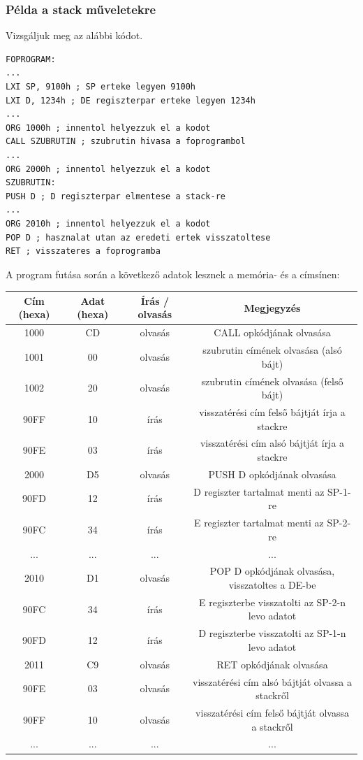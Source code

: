 \documentclass{article}
\begin{document}
\subsubsection{Példa a stack műveletekre}
Vizsgáljuk meg az alábbi kódot.
\begin{lstlisting}[frame=single]
FOPROGRAM:
...
LXI SP, 9100h ; SP erteke legyen 9100h
LXI D, 1234h ; DE regiszterpar erteke legyen 1234h
...
ORG 1000h ; innentol helyezzuk el a kodot
CALL SZUBRUTIN ; szubrutin hivasa a foprogrambol
...
ORG 2000h ; innentol helyezzuk el a kodot
SZUBRUTIN:
PUSH D ; D regiszterpar elmentese a stack-re
...
ORG 2010h ; innentol helyezzuk el a kodot
POP D ; hasznalat utan az eredeti ertek visszatoltese
RET ; visszateres a foprogramba
\end{lstlisting}
A program futása során a következő adatok lesznek a memória- és a címsínen:
\begin{center}
\begin{tabular}{ |c|c|c|c| } 
 \hline
 Cím (hexa) & Adat (hexa) & Írás / olvasás & Megjegyzés \\ \hline
 1000 & CD & olvasás & CALL opkódjának olvasása \\ \hline
 1001 & 00 & olvasás & szubrutin címének olvasása (alsó bájt) \\ \hline
 1002 & 20 & olvasás & szubrutin címének olvasása (felső bájt) \\ \hline
 90FF & 10 & írás & visszatérési cím felső bájtját írja a stackre \\ \hline
 90FE & 03 & írás & visszatérési cím alsó bájtját írja a stackre \\ \hline
 2000 & D5 & olvasás & PUSH D opkódjának olvasása \\ \hline
 90FD & 12 & írás & D regiszter tartalmat menti az SP-1-re \\ \hline
 90FC & 34 & írás & E regiszter tartalmat menti az SP-2-re \\ \hline
 ... & ... & ... & ... \\ \hline
 2010 & D1 & olvasás & POP D opkódjának olvasása, visszatoltes a DE-be \\ \hline
 90FC & 34 & írás & E regiszterbe visszatolti az SP-2-n levo adatot \\ \hline
 90FD & 12 & írás & D regiszterbe visszatolti az SP-1-n levo adatot \\ \hline
 2011 & C9 & olvasás & RET opkódjának olvasása \\ \hline
 90FE & 03 & olvasás & visszatérési cím alsó bájtját olvassa a stackről \\ \hline
 90FF & 10 & olvasás & visszatérési cím felső bájtját olvassa a stackről \\ \hline
 ... & ... & ... & ... \\ \hline
\end{tabular}
\end{center}
\end{document}
